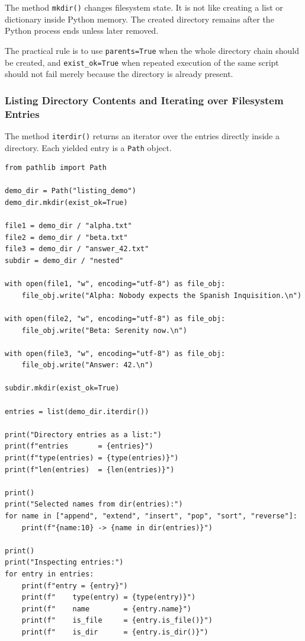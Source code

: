 The method \texttt{mkdir()} changes filesystem state. It is not like creating a list or dictionary inside Python memory. The created directory remains after the Python process ends unless later removed.

The practical rule is to use \texttt{parents=True} when the whole directory chain should be created, and \texttt{exist\_ok=True} when repeated execution of the same script should not fail merely because the directory is already present.

\subsubsection{Listing Directory Contents and Iterating over Filesystem Entries}

The method \texttt{iterdir()} returns an iterator over the entries directly inside a directory. Each yielded entry is a \texttt{Path} object.

\begin{verbatim}
from pathlib import Path

demo_dir = Path("listing_demo")
demo_dir.mkdir(exist_ok=True)

file1 = demo_dir / "alpha.txt"
file2 = demo_dir / "beta.txt"
file3 = demo_dir / "answer_42.txt"
subdir = demo_dir / "nested"

with open(file1, "w", encoding="utf-8") as file_obj:
    file_obj.write("Alpha: Nobody expects the Spanish Inquisition.\n")

with open(file2, "w", encoding="utf-8") as file_obj:
    file_obj.write("Beta: Serenity now.\n")

with open(file3, "w", encoding="utf-8") as file_obj:
    file_obj.write("Answer: 42.\n")

subdir.mkdir(exist_ok=True)

entries = list(demo_dir.iterdir())

print("Directory entries as a list:")
print(f"entries       = {entries}")
print(f"type(entries) = {type(entries)}")
print(f"len(entries)  = {len(entries)}")

print()
print("Selected names from dir(entries):")
for name in ["append", "extend", "insert", "pop", "sort", "reverse"]:
    print(f"{name:10} -> {name in dir(entries)}")

print()
print("Inspecting entries:")
for entry in entries:
    print(f"entry = {entry}")
    print(f"    type(entry) = {type(entry)}")
    print(f"    name        = {entry.name}")
    print(f"    is_file     = {entry.is_file()}")
    print(f"    is_dir      = {entry.is_dir()}")
\end{verbatim}

